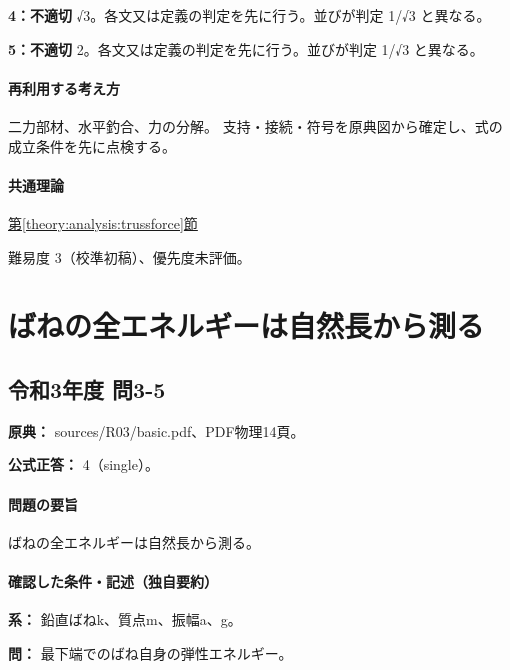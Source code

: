\noindent\textbf{4：不適切} √3。各文又は定義の判定を先に行う。並びが判定 1/√3 と異なる。\par

\noindent\textbf{5：不適切} 2。各文又は定義の判定を先に行う。並びが判定 1/√3 と異なる。\par

\paragraph{再利用する考え方} 二力部材、水平釣合、力の分解。 支持・接続・符号を原典図から確定し、式の成立条件を先に点検する。

\paragraph{共通理論} \hyperref[theory:analysis:trussforce]{第\ref*{theory:analysis:trussforce}節}

\par 難易度 3（校準初稿）、優先度未評価。

\section{ばねの全エネルギーは自然長から測る}

\subsection{令和3年度 問3-5}
\label{q:r03-reg-basic-3-5}

\noindent\textbf{原典：} sources/R03/basic.pdf、PDF物理14頁。

\textbf{公式正答：} 4（single）。

\paragraph{問題の要旨} ばねの全エネルギーは自然長から測る。

\paragraph{確認した条件・記述（独自要約）}\mbox{}\par

\noindent\textbf{系：} 鉛直ばねk、質点m、振幅a、g。\par

\noindent\textbf{問：} 最下端でのばね自身の弾性エネルギー。\par

